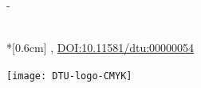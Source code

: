 \begin{adjustwidth*}{\unitlength}{-\unitlength}
\begin{adjustwidth}{-0.5cm}{-0.5cm}
        \noindent
        \parbox[b]{0.5\linewidth}{%
        	\noindent
            \Large 
            \thesisauthor{}\\*[0.6cm]
            \large
            \thesislocation{}, \the\year
            \small \medskip \newline
            \href{http://doi.org/10.11581/dtu:00000054}{DOI:10.11581/dtu:00000054}
        }
        \hfill\texttt{[image: DTU-logo-CMYK]}
    \end{adjustwidth}
\end{adjustwidth*}
\normalfont
\normalsize